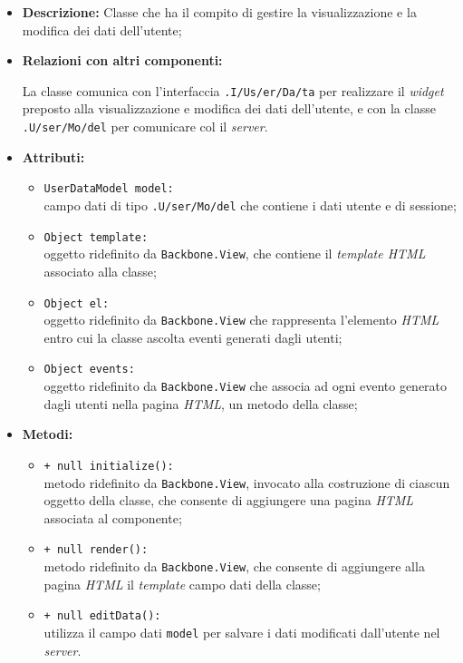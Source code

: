 \begin{flushleft}
\begin{itemize}
\item \textbf{Descrizione:} Classe che ha il compito di gestire la visualizzazione e la modifica dei dati dell'utente;
\item \textbf{Relazioni con altri componenti:}
\begin{sloppypar}
La classe comunica con l'interfaccia \texttt{\viewUser{}.I\fshyp{}Us\fshyp{}er\fshyp{}Da\fshyp{}ta} per realizzare il \textit{widget} preposto alla visualizzazione e modifica dei dati dell'utente, e con la classe \texttt{\model{}.U\fshyp{}ser\fshyp{}Mo\fshyp{}del} per comunicare col il \textit{server}.
\end{sloppypar}
\item \textbf{Attributi:}
\begin{sloppypar}
\begin{itemize}
\item \texttt{UserDataModel model:}\\ campo dati di tipo \texttt{\model{}.U\fshyp{}ser\fshyp{}Mo\fshyp{}del} che contiene i dati utente e di sessione;
\item \texttt{Object template:}\\ oggetto ridefinito da \texttt{Backbone.View}, che contiene il \textit{template HTML} associato alla classe;
\item \texttt{Object el:}\\ oggetto ridefinito da \texttt{Backbone.View} che rappresenta l'elemento \textit{HTML} entro cui la classe ascolta eventi generati dagli utenti;
\item \texttt{Object events:}\\ oggetto ridefinito da \texttt{Backbone.View} che associa ad ogni evento generato dagli utenti nella pagina \textit{HTML}, un metodo della classe;
\end{itemize}
\end{sloppypar}
\item \textbf{Metodi:}
\begin{sloppypar}
\begin{itemize}
\item \texttt{+ null initialize():}\\ metodo ridefinito da \texttt{Backbone.View}, invocato alla costruzione di ciascun oggetto della classe, che consente di aggiungere una pagina \textit{HTML} associata al componente;
\item \texttt{+ null render():}\\ metodo ridefinito da \texttt{Backbone.View}, che consente di aggiungere alla pagina \textit{HTML} il \textit{template} campo dati della classe;
\item \texttt{+ null editData():}\\ utilizza il campo dati \texttt{model} per salvare i dati modificati dall'utente nel \textit{server}.
\end{itemize}
\end{sloppypar}
\end{itemize}
\end{flushleft}

